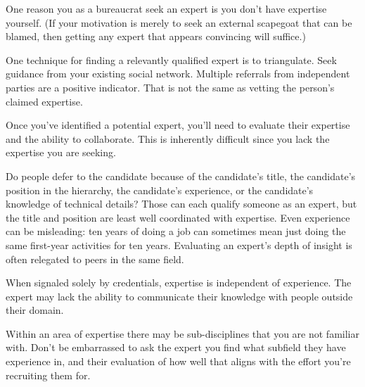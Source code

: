 One reason you as a bureaucrat seek an expert is you don't have expertise yourself. (If your motivation is merely to seek an external scapegoat that can be blamed, then getting any expert that appears convincing will suffice.)

One technique for finding a relevantly qualified expert is to triangulate. 
Seek guidance from your existing social network. Multiple referrals from independent parties are a positive indicator. That is not the same as vetting the person's claimed expertise.

Once you've identified a potential expert, you'll need to evaluate their expertise and the ability to collaborate. This is inherently difficult since you lack the expertise you are seeking.

Do people defer to the candidate because of the candidate's title, the candidate's position in the hierarchy, the candidate's experience, or the candidate's knowledge of technical details? Those can each qualify someone as an expert, but the title and position are least well coordinated with expertise. Even experience can be misleading: ten years of doing a job can sometimes mean just doing the same first-year activities for ten years. %
Evaluating an expert's depth of insight is often relegated to peers in the same field. 

 

When signaled solely by credentials, expertise is independent of experience. The expert may lack the ability to communicate their knowledge with people outside their domain.

Within an area of expertise there may be sub-disciplines that you are not familiar with. Don't be embarrassed to ask the expert you find what subfield they have experience in, and their evaluation of how well that aligns with the effort you're recruiting them for.



